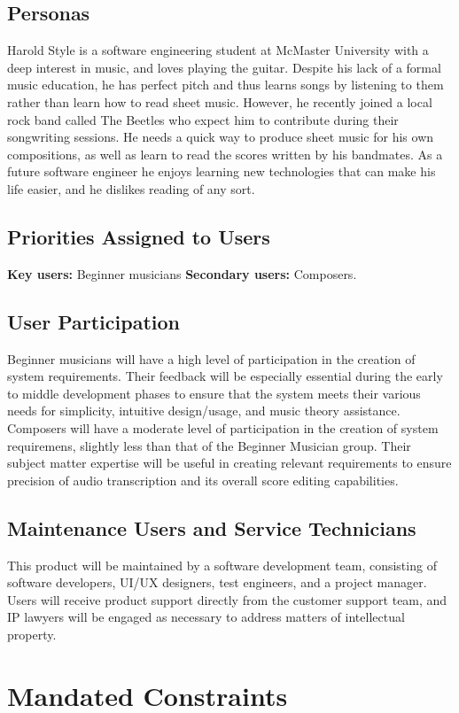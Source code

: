 \documentclass[12pt]{article}
\begin{document}
\subsection{Personas}
Harold Style is a software engineering student at McMaster University with a deep interest in music, and loves playing the guitar. Despite his lack of a formal music education, 
he has perfect pitch and thus learns songs by listening to them rather than learn how to read sheet music. However, he recently joined a local rock band called The Beetles who 
expect him to contribute during their songwriting sessions. He needs a quick way to produce sheet music for his own compositions, as well as learn to read the scores written by 
his bandmates. As a future software engineer he enjoys learning new technologies that can make his life easier, and he dislikes reading of any sort.
\subsection{Priorities Assigned to Users}
\textbf{Key users:} Beginner musicians
\textbf{Secondary users:} Composers.
\subsection{User Participation}
Beginner musicians will have a high level of participation in the creation of system requirements. Their feedback will be especially essential during the early to middle development phases to ensure that the system meets their various needs for simplicity, intuitive design/usage, and music theory assistance.
Composers will have a moderate level of participation in the creation of system requiremens, slightly less than that of the Beginner Musician group. Their subject matter expertise will be useful in creating relevant requirements to ensure precision of audio transcription and its overall score editing capabilities.
\subsection{Maintenance Users and Service Technicians}
This product will be maintained by a software development team, consisting of software developers, UI/UX designers, test engineers, and a project manager. 
Users will receive product support directly from the customer support team, and IP lawyers will be engaged as necessary to address matters of intellectual property.

\section{Mandated Constraints}
\end{document}

